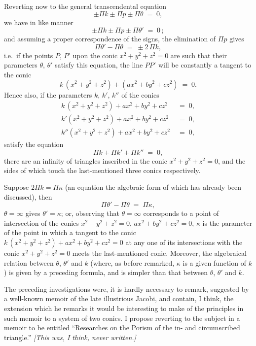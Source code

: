 \documentclass[11pt]{article}
\begin{document}
Reverting now to the general transcendental equation
\[
\pm \Pi k \pm \Pi p \pm \Pi \theta \;=\; 0,
\]
we have in like manner
\[
\pm \Pi k \pm \Pi p \pm \Pi \theta' \;=\; 0\,;
\]
and assuming a proper correspondence of the signs, the elimination of $\Pi p$ gives
\[
\Pi \theta' - \Pi \theta \;=\; \pm 2\,\Pi k,
\]
i.e.\ if the points $P$, $P'$ upon the conic $x^{2} + y^{2} + z^{2} = 0$ are such that their parameters $\theta$, $\theta'$ satisfy this equation, the line $PP'$ will be constantly a tangent to the conic
\[
k\,(x^{2} + y^{2} + z^{2}) + (a x^{2} + b y^{2} + c z^{2}) \;=\; 0.
\]
Hence also, if the parameters $k$, $k'$, $k''$ of the conics
\begin{align*}
k\,(x^{2} + y^{2} + z^{2}) + a x^{2} + b y^{2} + c z^{2} &\;=\; 0,\\
k'(x^{2} + y^{2} + z^{2}) + a x^{2} + b y^{2} + c z^{2} &\;=\; 0,\\
k''(x^{2} + y^{2} + z^{2}) + a x^{2} + b y^{2} + c z^{2} &\;=\; 0,
\end{align*}
satisfy the equation
\[
\Pi k + \Pi k' + \Pi k'' \;=\; 0,
\]
there are an infinity of triangles inscribed in the conic $x^{2} + y^{2} + z^{2} = 0$, and the sides of which touch the last-mentioned three conics respectively.

Suppose $2 \Pi k = \Pi \kappa$ (an equation the algebraic form of which has already been discussed), then
\[
\Pi \theta' - \Pi \theta \;=\; \Pi \kappa,
\]
$\theta = \infty$ gives $\theta' = \kappa$; or, observing that $\theta = \infty$ corresponds to a point of intersection of the conics $x^{2} + y^{2} + z^{2} = 0$, $a x^{2} + b y^{2} + c z^{2} = 0$, $\kappa$ is the parameter of the point in which a tangent to the conic $k\,(x^{2} + y^{2} + z^{2}) + a x^{2} + b y^{2} + c z^{2} = 0$ at any one of its intersections with the conic $x^{2} + y^{2} + z^{2} = 0$ meets the last-mentioned conic. Moreover, the algebraical relation between $\theta$, $\theta'$ and $k$ (where, as before remarked, $\kappa$ is a given function of $k$) is given by a preceding formula, and is simpler than that between $\theta$, $\theta'$ and $k$.

The preceding investigations were, it is hardly necessary to remark, suggested by a well-known memoir of the late illustrious Jacobi, and contain, I think, the extension which he remarks it would be interesting to make of the principles in such memoir to a system of two conics. I propose reverting to the subject in a memoir to be entitled ``Researches on the Porism of the in- and circumscribed triangle.'' \emph{[This was, I think, never written.]}
\end{document}
